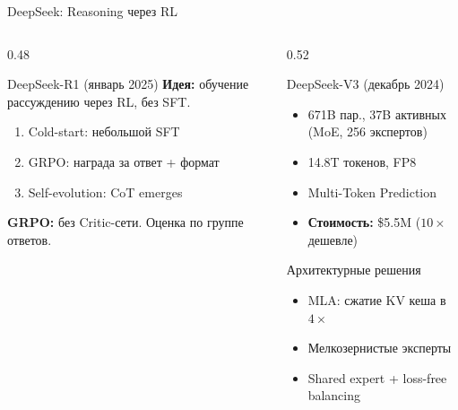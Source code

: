 \documentclass[aspectratio=169, 8pt]{beamer}
\begin{document}
\begin{frame}{DeepSeek: Reasoning через RL}
  \begin{columns}[T]
    \begin{column}{0.48\textwidth}
      \begin{block}{DeepSeek-R1 (январь 2025)}
        \textbf{Идея:} обучение рассуждению через RL, без SFT.
        \begin{enumerate}\small
          \item Cold-start: небольшой SFT
          \item GRPO: награда за ответ + формат
          \item Self-evolution: CoT emerges
        \end{enumerate}
      \end{block}
      \textbf{GRPO:} без Critic-сети. Оценка по группе ответов.
    \end{column}
    \begin{column}{0.52\textwidth}
      \begin{block}{DeepSeek-V3 (декабрь 2024)}
        \begin{itemize}\small
          \item 671B пар., 37B активных (MoE, 256 экспертов)
          \item 14.8T токенов, FP8
          \item Multi-Token Prediction
          \item \textbf{Стоимость:} \$5.5M ($10\times$ дешевле)
        \end{itemize}
      \end{block}
      \begin{block}{Архитектурные решения}
        \begin{itemize}\small
          \item MLA: сжатие KV кеша в $4\times$
          \item Мелкозернистые эксперты
          \item Shared expert + loss-free balancing
        \end{itemize}
      \end{block}
    \end{column}
  \end{columns}
\end{frame}
\end{document}
